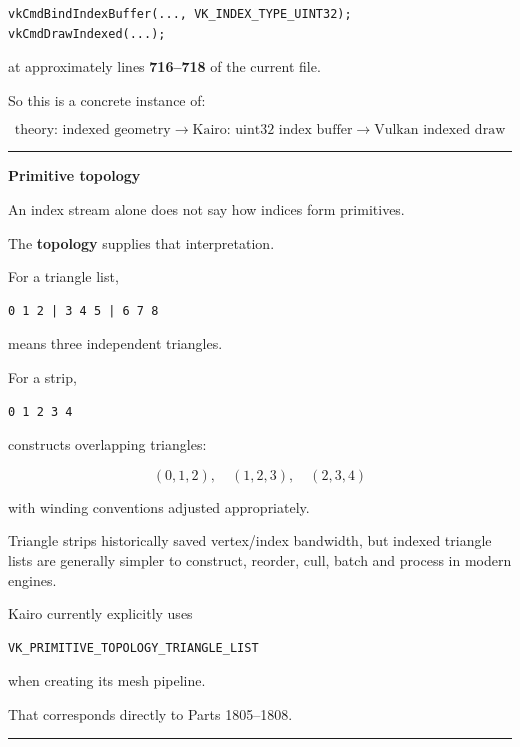 \begin{verbatim}
vkCmdBindIndexBuffer(..., VK_INDEX_TYPE_UINT32);
vkCmdDrawIndexed(...);
\end{verbatim}

at approximately lines \textbf{716--718} of the current file.

So this is a concrete instance of:

\[
\boxed{\text{theory: indexed geometry}
\rightarrow
\text{Kairo: uint32 index buffer}
\rightarrow
\text{Vulkan indexed draw}}
\]

\begin{center}\rule{0.5\linewidth}{0.5pt}\end{center}

\textbf{Primitive topology}

An index stream alone does not say how indices form primitives.

The \textbf{topology} supplies that interpretation.

For a triangle list,

\begin{verbatim}
0 1 2 | 3 4 5 | 6 7 8
\end{verbatim}

means three independent triangles.

For a strip,

\begin{verbatim}
0 1 2 3 4
\end{verbatim}

constructs overlapping triangles:

\[
(0,1,2),\quad
(1,2,3),\quad
(2,3,4)
\]

with winding conventions adjusted appropriately.

Triangle strips historically saved vertex/index bandwidth, but indexed triangle lists are generally simpler to construct, reorder, cull, batch and process in modern engines.

Kairo currently explicitly uses

\begin{verbatim}
VK_PRIMITIVE_TOPOLOGY_TRIANGLE_LIST
\end{verbatim}

when creating its mesh pipeline.

That corresponds directly to Parts 1805--1808.

\begin{center}\rule{0.5\linewidth}{0.5pt}\end{center}

